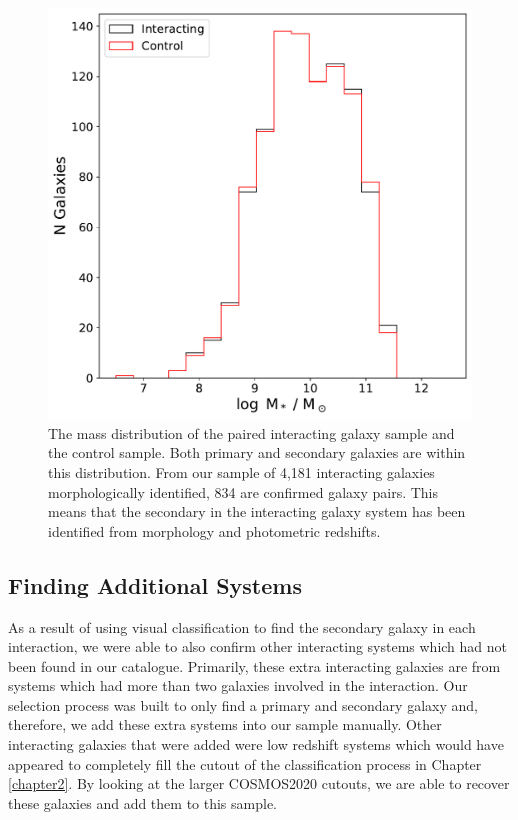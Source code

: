 \begin{figure}
    \centering
    \includegraphics[width=\textwidth]{Chapter3/figures/mass-matching-pairs.pdf}
    \caption[The mass distribution of the paired interacting galaxy sample and the control sample.]{The mass distribution of the paired interacting galaxy sample and the control sample. Both primary and secondary galaxies are within this distribution. From our sample of 4,181 interacting galaxies morphologically identified, 834 are confirmed galaxy pairs. This means that the secondary in the interacting galaxy system has been identified from morphology and photometric redshifts.}
    \label{fig:matched-distributions}
\end{figure}

\subsection{Finding Additional Systems}
\noindent As a result of using visual classification to find the secondary galaxy in each interaction, we were able to also confirm other interacting systems which had not been found in our catalogue. Primarily, these extra interacting galaxies are from systems which had more than two galaxies involved in the interaction. Our selection process was built to only find a primary and secondary galaxy and, therefore, we add these extra systems into our sample manually. Other interacting galaxies that were added were low redshift systems which would have appeared to completely fill the cutout of the classification process in Chapter \ref{chapter2}. By looking at the larger COSMOS2020 cutouts, we are able to recover these galaxies and add them to this sample.

